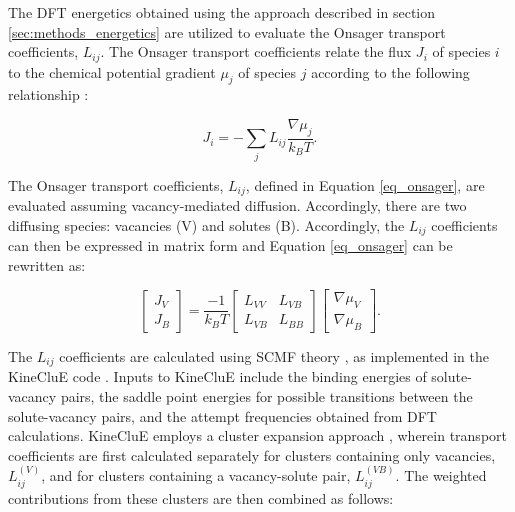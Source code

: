 \documentclass[preprint,12pt]{elsarticle}
\begin{document}
The DFT energetics obtained using the approach described in section \ref{sec:methods_energetics} are utilized to evaluate the Onsager transport coefficients, $L_{ij}$. The Onsager transport coefficients relate the flux $J_i$ of species $i$ to the chemical potential gradient $\mu_j$ of species $j$ according to the following relationship \citep{allnatt_atomic_2003}:

\begin{equation}
   J_i = -\sum_j{L_{ij} \frac{\nabla\mu_j}{k_B T}}. 
   \label{eq_onsager}
\end{equation}

The Onsager transport coefficients, $L_{ij}$, defined in Equation \ref{eq_onsager}, are evaluated assuming vacancy-mediated diffusion. Accordingly, there are two diffusing species: vacancies (V) and solutes (B). Accordingly, the $L_{ij}$ coefficients can then be expressed in matrix form and Equation \ref{eq_onsager} can be rewritten as:

\begin{equation}
\label{matrix_form_onsager}
    \begin{bmatrix}
        J_V \\
        J_B 
    \end{bmatrix}=\frac{-1}{k_B T}
    \begin{bmatrix}
    L_{VV} & L_{VB} \\
    L_{VB} & L_{BB}
    \end{bmatrix}
        \begin{bmatrix}
        \nabla\mu_V \\
        \nabla\mu_B
    \end{bmatrix}.
\end{equation}

\noindent The $L_{ij}$ coefficients are calculated using SCMF theory \citep{nastar_self-consistent_2000, nastar_mean_2005}, as implemented in the KineCluE code \citep{schuler_kineclue_2020}. Inputs to KineCluE include the binding energies of solute-vacancy pairs, the saddle point energies for possible transitions between the solute-vacancy pairs, and the attempt frequencies obtained from DFT calculations. KineCluE employs a cluster expansion approach \citep{schuler_kineclue_2020}, wherein transport coefficients are first calculated separately for clusters containing only vacancies, $L_{ij}^{(V)}$, and for clusters containing a vacancy-solute pair, $L_{ij}^{(VB)}$. The weighted contributions from these clusters are then combined as follows:
\end{document}
